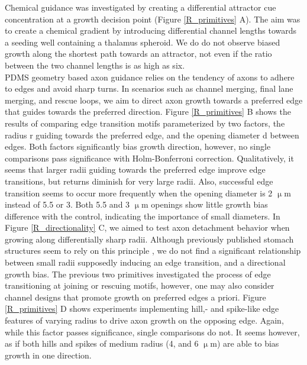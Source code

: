 Chemical guidance was investigated by creating a differential attractor cue
concentration at a growth decision point (Figure \ref{R_primitives} A). The aim
was to create a chemical gradient by introducing differential channel lengths
towards a seeding well containing a thalamus spheroid. We do do not observe
biased growth along the shortest path towards an attractor, not even if the
ratio between the two channel lengths is as high as six. \\

PDMS geometry based axon guidance relies on the tendency of axons to adhere to
edges and avoid sharp turns. In scenarios such as channel merging, final lane
merging, and rescue loops, we aim to direct axon growth towards a preferred edge
that guides towards the preferred direction. Figure \ref{R_primitives} B shows
the results of comparing edge transition motifs parameterized by two factors,
the radius r guiding towards the preferred edge, and the opening diameter d
between edges. Both factors significantly bias growth direction, however, no
single comparisons pass significance with Holm-Bonferroni correction.
Qualitatively, it seems that larger radii guiding towards the preferred edge
improve edge transitions, but returns diminish for very large radii. Also,
successful edge transition seems to occur more frequently when the opening
diameter is 2 $\upmu$m instead of 5.5 or 3. Both 5.5 and 3 $\upmu$m openings
show little growth bias difference with the control, indicating the importance
of small diameters. In Figure \ref{R_directionality} C, we aimed to test axon
detachment behavior when growing along differentially sharp radii. Although
previously published stomach structures seem to rely on this principle
\parencite{forro}, we do not find a significant relationship between small radii
supposedly inducing an edge transition, and a directional growth bias. The
previous two primitives investigated the process of edge transitioning at
joining or rescuing motifs, however, one may also consider channel designs that
promote growth on preferred edges a priori. Figure \ref{R_primitives} D shows
experiments implementing hill,- and spike-like edge features of varying radius
to drive axon growth on the opposing edge. Again, while this factor passes
significance, single comparisons do not. It seems however, as if both hills and
spikes of medium radius (4, and 6 $\upmu$m) are able to bias growth in one
direction. \\

